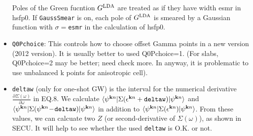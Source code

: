 \documentclass[a4paper,10pt,epsf,fleqn]{article}
\begin{document}
\begin{itemize}
Poles of  the Green fucntion $G^{\rm LDA}$ are treated as if they have width esmr in hsfp0. 
If {\tt GaussSmear} is on, each pole of $G^{\rm LDA}$
is smeared by a Gaussian function with $\sigma=${\tt esmr} in the calculation of hsfp0.
\item
   \verb+Q0Pchoice+: This controls how to choose offset Gamma points in
   a new version (2012 version).
   It is usually better to used Q0Pchoice=1. 
   (For slabs, Q0Pchoice=2 may be better; need check more. In anyway,
    it is problematic to use unbalanced k points for anisotropic cell).

\item \verb+deltaw+ (only for one-shot GW) is the interval for the numerical derivative
$\frac{\partial \Sigma(\omega)}{\partial \omega}$ in EQ.8.
We calculate $\langle \psi^{{\bf k}n} |\Sigma(\epsilon^{{\bf k}n}+{\tt deltaw}) |\psi^{{\bf k}n} \rangle$ 
and $\langle \psi^{{\bf k}n} |\Sigma(\psi^{{\bf k}n}\!-\!{\tt deltaw})|\psi^{{\bf k}n} \rangle$
in addition to $\langle \psi^{{\bf k}n} |\Sigma(\epsilon^{{\bf k}n})|\psi^{{\bf k}n} \rangle$.
From these values, we can calcuate two $Z$ (or second-derivative of $\Sigma(\omega)$), as shown
in {\sf SECU}. It will help to see whether the used \verb#deltaw# is O.K. or not.
     

\end{itemize}
\end{document}
